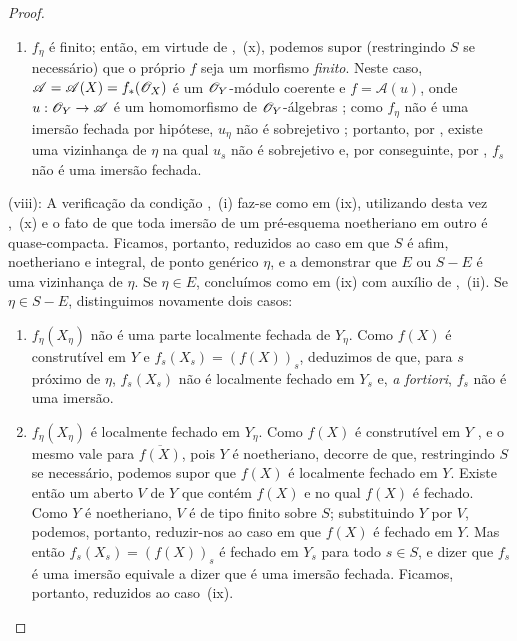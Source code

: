 \begin{proof}
\begin{enumerate}[label=\upshape{$\arabic{enumi}^\circ$}]
  \item $f_\eta$ é finito; então, em virtude de ,~(x), podemos supor (restringindo $S$ se necessário) que o próprio $f$ seja um morfismo \emph{finito}.
  Neste caso, $\mathscr{A}=\mathscr{A}(X)=f_*(\mathscr{O}_X)$ é um $\mathscr{O}_Y$-módulo coerente  e $f=\mathscr{A}(u)$, onde $u:\sh{O}_Y\to\mathscr{A}$ é um homomorfismo de $\mathscr{O}_Y$-álgebras ; como $f_\eta$ não é uma imersão fechada por hipótese, $u_\eta$ não é sobrejetivo ; portanto, por , existe uma vizinhança de $\eta$ na qual $u_s$ não é sobrejetivo e, por conseguinte, por , $f_s$ não é uma imersão fechada.
\end{enumerate}

(viii): A verificação da condição ,~(i) faz-se como em (ix), utilizando desta vez ,~(x) e o fato de que toda imersão de um pré-esquema noetheriano em outro é quase-compacta.
Ficamos, portanto, reduzidos ao caso em que $S$ é afim, noetheriano e integral, de ponto genérico $\eta$, e a demonstrar que $E$ ou $S-E$ é uma vizinhança de $\eta$.
Se $\eta\in E$, concluímos como em (ix) com auxílio de ,~(ii).
Se $\eta\in S-E$, distinguimos novamente dois casos:


\begin{enumerate}[label=\upshape{$\arabic{enumi}^\circ$}]
  \item $f_\eta(X_\eta)$ não é uma parte localmente fechada de $Y_\eta$.
  Como $f(X)$ é construtível em $Y$  e $f_s(X_s)=(f(X))_s$, deduzimos de  que, para $s$ próximo de $\eta$, $f_s(X_s)$ não é localmente fechado em $Y_s$ e, \emph{a fortiori}, $f_s$ não é uma imersão.

  \item $f_\eta(X_\eta)$ é localmente fechado em $Y_\eta$.
  Como $f(X)$ é construtível em $Y$ , e o mesmo vale para $\overline{f(X)}$, pois $Y$ é noetheriano, decorre de  que, restringindo $S$ se necessário, podemos supor que $f(X)$ é localmente fechado em $Y$.
  Existe então um aberto $V$ de $Y$ que contém $f(X)$ e no qual $f(X)$ é fechado.
  Como $Y$ é noetheriano, $V$ é de tipo finito sobre $S$; substituindo $Y$ por $V$, podemos, portanto, reduzir-nos ao caso em que $f(X)$ é fechado em $Y$.
  Mas então $f_s(X_s)=(f(X))_s$ é fechado em $Y_s$ para todo $s\in S$, e dizer que $f_s$ é uma imersão equivale a dizer que é uma imersão fechada.
  Ficamos, portanto, reduzidos ao caso~(ix).
\end{enumerate}


\end{proof}
